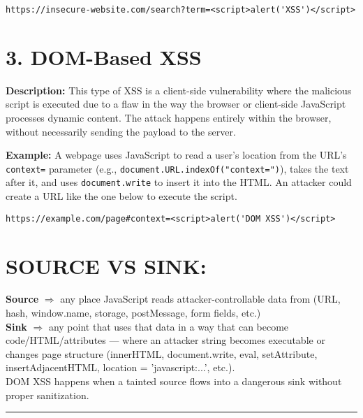 \documentclass{article}
\begin{document}
\begin{lstlisting}[caption={Reflected XSS example: crafted search URL}, label={lst:reflected}, firstnumber=1, frame=single]
    https://insecure-website.com/search?term=<script>alert('XSS')</script>
\end{lstlisting}

\section*{3. DOM-Based XSS}
\textbf{Description:} This type of XSS is a client-side vulnerability where the malicious script is executed due to a flaw in the way the browser or client-side JavaScript processes dynamic content. The attack happens entirely within the browser, without necessarily sending the payload to the server.

\textbf{Example:}
A webpage uses JavaScript to read a user's location from the URL's \texttt{context=} parameter (e.g., \texttt{document.URL.indexOf("context=")}), takes the text after it, and uses \texttt{document.write} to insert it into the HTML. An attacker could create a URL like the one below to execute the script.

\begin{lstlisting}[caption={DOM-Based XSS example: URL with payload in fragment}, label={lst:dom}, firstnumber=1, frame=single]
    https://example.com/page#context=<script>alert('DOM XSS')</script>
\end{lstlisting}

\section*{SOURCE VS SINK:}

\textbf{Source} $\Longrightarrow$ any place JavaScript reads attacker-controllable data from (URL, hash, window.name, storage, postMessage, form fields, etc.) 
\\ \textbf{Sink} $\Longrightarrow$ any point that uses that data in a way that can become code/HTML/attributes — where an attacker string becomes executable or changes page structure (innerHTML, document.write, eval, setAttribute, insertAdjacentHTML, location = 'javascript:...', etc.). 
\\ DOM XSS happens when a tainted source flows into a dangerous sink without proper sanitization.

\rule{15cm}{0.6pt}
\end{document}
